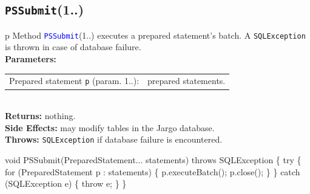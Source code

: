 \subsection{\texttt{PSSubmit}(1..)}
\begin{tabular}{p{\textwidth}}
\toprule
{}
Method \textcolor{blue}{{\tt{}\protect{}PSSubmit}}(1..) executes a prepared statement's batch.
A {\tt{}SQLException} is thrown in case of database failure.\\
\midrule
\textbf{Parameters:} \\
\begin{tabular}{lp{116mm}}
Prepared statement {\tt{}p} (param. 1..):&prepared statements.
\end{tabular}\\
\textbf{Returns:} nothing.\\
\textbf{Side Effects:} may modify tables in the Jargo database.\\
\textbf{Throws:} {\tt{}SQLException} if database failure is encountered.\\
\bottomrule
\end{tabular}
\nwenddocs{}\endmoddef{}
void PSSubmit(PreparedStatement... statements) throws SQLException \{
  try \{
    for (PreparedStatement p : statements) \{
      p.executeBatch();
      p.close();
    \}
  \} catch (SQLException e) \{
    throw e;
  \}
\}
\eatline
{}\nwendcode{}\nwdocspar
